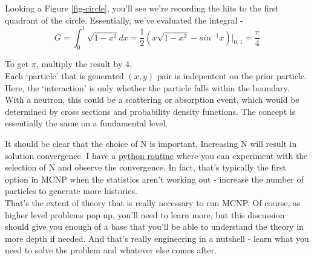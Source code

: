 \documentclass[11pt,a4paper]{article}
\begin{document}
\noindent Looking a Figure \ref{fig-circle}, you'll see we're recording the hits to the first quadrant of the circle. Essentially, we've evaluated the integral - 
\begin{equation}
    G = \int_0^1 \sqrt{1-x^2} dx = \frac{1}{2}(x\sqrt{1-x^2} - sin^{-1}x)|_{0,1} = \frac{\pi}{4}
\end{equation}

\noindent To get $\pi$, multiply the result by 4.\\

\noindent Each `particle' that is generated $(x,y)$ pair is indepentent on the prior particle. Here, the `interaction' is only whether the particle falls within the boundary. With a neutron, this could be a scattering or absorption event, which would be determined by cross sections and probability density functions. The concept is essentially the same on a fundamental level. 

\noindent It should be clear that the choice of N is important. Increasing N will result in solution convergence. I have a \href{https://github.com/TheDoctorRAB/education/blob/master/src/monte.carlo.simple.py}{python routine} where you can experiment with the selection of N and observe the convergence. In fact, that's typically the first option in MCNP when the statistics aren't working out - increase the number of particles to generate more histories. \\

\noindent That's the extent of theory that is really necessary to run MCNP. Of course, as higher level problems pop up, you'll need to learn more, but this discussion should give you enough of a base that you'll be able to understand the theory in more depth if needed. And that's really engineering in a nutshell - learn what you need to solve the problem and whatever else comes after. 

\newpage
\end{document}
